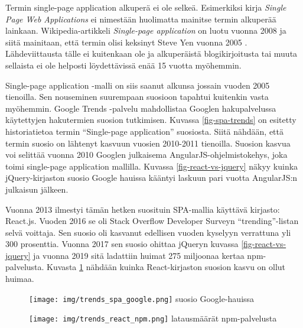 \documentclass[finnish,twoside,censored,csm,sw-track-2018]{HYthesisML}
\begin{document}
Termin single-page application alkuperä ei ole selkeä. Esimerkiksi kirja \textit{Single  Page  Web  Applications} \citep{Mikowski} ei nimestään huolimatta mainitse termin alkuperää lainkaan. Wikipedia-artikkeli \textit{Single-page application} on luotu vuonna 2008 ja siitä mainitaan, että termin olisi keksinyt Steve Yen vuonna 2005 \citep{wikiSPA-2008}. Lähdeviittausta tälle ei kuitenkaan ole ja alkuperäistä blogikirjoitusta tai muuta sellaista ei ole helposti löydettävissä enää 15 vuotta myöhemmin.

Single-page application -malli on siis saanut alkunsa jossain vuoden 2005 tienoilla. Sen nouseminen suurempaan suosioon tapahtui kuitenkin vasta myöhemmin. Google Trends -palvelu mahdollistaa Googlen hakupalvelussa käytettyjen hakutermien suosion tutkimisen. Kuvassa \ref{fig-spa-trends} on esitetty historiatietoa termin ``Single-page application'' suosiosta. Siitä nähdään, että termin suosio on lähtenyt kasvuun vuosien 2010-2011 tienoilla. Suosion kasvua voi selittää vuonna 2010 Googlen julkaisema \citep{angularJS-release} AngularJS-ohjelmistokehys, joka toimi single-page application mallilla. Kuvassa \ref{fig-react-vs-jquery} näkyy kuinka jQuery-kirjaston suosio Google hauissa kääntyi laskuun pari vuotta AngularJS:n julkaisun jälkeen.

Vuonna 2013 ilmestyi tämän hetken suosituin SPA-mallia käyttävä kirjasto: React.js. Vuoden 2016 se oli Stack Overflow Developer Surveyn \citep{SO-survey-2016} ``trending''-listan selvä voittaja. Sen suosio oli kasvanut edellisen vuoden kyselyyn verrattuna yli 300 prosenttia. Vuonna 2017 sen suosio ohittaa jQueryn kuvassa \ref{fig-react-vs-jquery} ja vuonna 2019 sitä ladattiin huimat 275 miljoonaa kertaa npm-palvelusta. Kuvasta \ref{fig-react-npm} nähdään kuinka React-kirjaston suosion kasvu on ollut huimaa. 

\begin{figure}
\centering
\begin{minipage}{0.5\textwidth}
    \centering
    \texttt{[image: img/trends\_spa\_google.png]}
    \footnotesize suosio Google-hauissa
    \label{fig-spa-trends}
\end{minipage}%
\begin{minipage}{0.5\textwidth}
  \centering
  \texttt{[image: img/trends\_react\_npm.png]}
  \footnotesize latausmäärät npm-palvelusta
  \label{fig-react-npm}
\end{minipage}
\end{figure}
\end{document}
